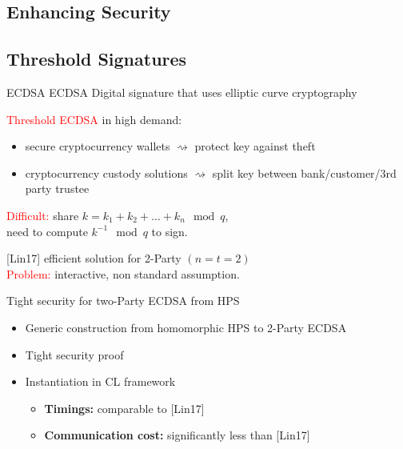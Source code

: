 \documentclass[10pt]{beamer}
\begin{document}



%

%

%


\subsection{Enhancing Security}



\subsection{Threshold Signatures}

\begin{frame}{ECDSA}
\textcolor{mLightBrown}{ECDSA} Digital signature that uses elliptic curve cryptography

\textcolor{red}{Threshold ECDSA} in high demand:
\begin{itemize}
\item secure cryptocurrency wallets $\rightsquigarrow$ protect key against theft
\item cryptocurrency custody solutions $\rightsquigarrow$ split key between bank/customer/3rd party trustee
\end{itemize}
\textcolor{red}{Difficult:} share $k = k_1 + k_2 + \dots + k_n \mod q$, \\
\hspace{1.3cm} need to compute $k^{-1} \mod q$ to sign.

\textcolor{darkjunglegreen}{[Lin17]} efficient solution for 2-Party $(n=t=2)$\\
\hspace{1cm} \textcolor{red}{Problem:} interactive, non standard assumption.

\end{frame}



\begin{frame}{Tight security for two-Party ECDSA from HPS}
\begin{itemize}
\item Generic construction from homomorphic HPS to 2-Party ECDSA
\item Tight security proof
\item Instantiation in CL framework
\begin{itemize}
\item \textbf{Timings:} comparable to [Lin17]
\item \textbf{Communication cost:} significantly less than [Lin17]
\end{itemize}
\end{itemize}
\end{frame}
\end{document}
